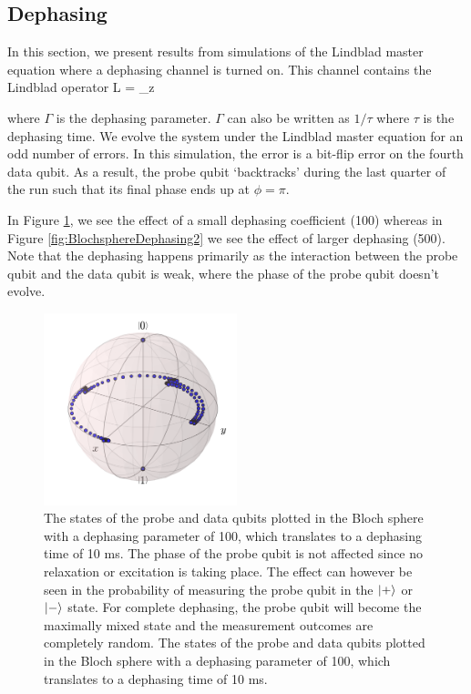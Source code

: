 \subsection{Dephasing}
In this section, we present results from simulations of the Lindblad master equation where a dephasing channel is turned on. This channel contains the Lindblad operator
\beq
L  = \sqrt{\Gamma} \sigma_z
\eeq

where $\Gamma$ is the dephasing parameter. $\Gamma$ can also be written as $1/\tau$ where $\tau$ is the dephasing time. We evolve the system under the Lindblad master equation for an odd number of errors. In this simulation, the error is a bit-flip error on the fourth data qubit.  As a result, the probe qubit `backtracks'  during the last quarter of the run such that its final phase ends up at $\phi = \pi$. 

In Figure \ref{fig:BlochsphereDephasing}, we see the effect of a small dephasing coefficient (100) whereas in Figure \ref{fig:BlochsphereDephasing2} we see the effect of larger dephasing (500). Note that the dephasing happens primarily as the interaction between the probe qubit and the data qubit is weak, where the phase of the probe qubit doesn't evolve. 



\begin{figure}[h]
  \centering
    \includegraphics[width=0.5\textwidth]{Figures/Circ_orbit_odd_100_dephasing.png}
      \caption{The states of the probe and data qubits plotted in the Bloch sphere with a dephasing parameter of 100, which translates to a dephasing time of 10 ms. The phase of the probe qubit is not affected since no relaxation or excitation is taking place. The effect can however be seen in the probability of measuring the probe qubit in the $\ket{+}$ or $\ket{-}$ state. For complete dephasing, the probe qubit will become the maximally mixed state and the measurement outcomes are completely random. The states of the probe and data qubits plotted in the Bloch sphere with a dephasing parameter of 100, which translates to a dephasing time of 10 ms.}
      \label{fig:BlochsphereDephasing}
      
\end{figure}





